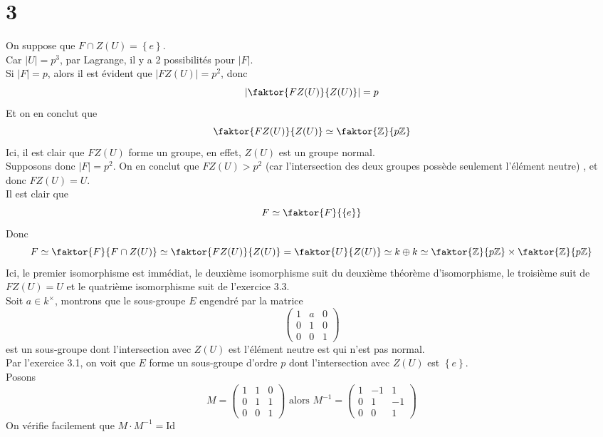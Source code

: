 \documentclass[11pt, a4paper]{article}
\newcommand{\zpz}{\faktor{\mathbb{Z}}{p \mathbb{Z}}}
\begin{document}
\section*{3}
On suppose que $F\cap Z( U) = \left\{ e  \right\} $.\\

Car $|U|= p^{3}$, par Lagrange, il y a 2 possibilités pour $|F|$.\\
Si $|F|=p$, alors il est évident que $|FZ( U)| = p^{2} $, donc
\[ 
	| \faktor { FZ( U)  } { Z( U) } | = p
\]
Et on en conclut que
\[ 
\faktor { FZ( U)  } { Z( U) }\simeq \zpz
\]
Ici, il est clair que $FZ( U) $ forme un groupe, en effet, $Z( U) $ est un groupe normal.\\
Supposons donc $|F|=p^{2}$.
On en conclut que $FZ( U) >p^{2}$ (car l'intersection des deux groupes possède seulement l'élément neutre) , et donc $FZ( U) = U$.\\

Il est clair que 
\[ 
F \simeq \faktor { F}  { \left\{ e  \right\} } 
\]
Donc
\[ 
	F  \simeq \faktor { F}  { F \cap Z( U)  } \simeq \faktor { F Z( U) } { Z( U) } = \faktor { U} { Z( U) } \simeq k \oplus k \simeq \zpz\times\zpz
\]
Ici, le premier isomorphisme est immédiat, le deuxième isomorphisme suit du deuxième théorème d'isomorphisme, le troisième suit de  $FZ( U) = U$ et le quatrième isomorphisme suit de l'exercice 3.3.\\

Soit $a\in k^{\times}$, montrons que le sous-groupe $E$ engendré par la matrice
\[ 
\begin{pmatrix}
	1 & a & 0\\
	0 & 1 & 0\\
	0 & 0 &1
\end{pmatrix}
\]
est un sous-groupe dont l'intersection avec $Z( U) $ est l'élément neutre est qui n'est pas normal.\\
Par l'exercice 3.1, on voit que $E$ forme un sous-groupe d'ordre $p$ dont l'intersection avec $Z( U)$ est $ \left\{ e  \right\} $.\\ 
Posons 
\[ 
M = 
\begin{pmatrix}
	1 &1 & 0\\
	0 &1 & 1\\
	0 & 0& 1
\end{pmatrix}
\text{ alors } 
M^{-1}=
\begin{pmatrix}
	1 &-1 & 1\\
	0 &1 & -1\\
	0 & 0& 1
\end{pmatrix}
\]
On vérifie facilement que $M \cdot M^{-1}= \mathrm{Id}$	
\end{document}
